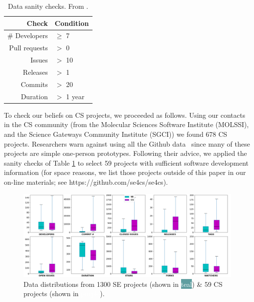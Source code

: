 \documentclass[sigconf,review,anonymous]{acmart}
\begin{document}
\begin{table}
\caption{Data sanity checks. From \cite{Kalliamvakou:2014}.}\label{tbl:sanity}
\footnotesize
 
 \begin{tabular}{r|l}
 Check   & Condition    \\\hline
 \# Developers & $\geq$ 7 \\
 Pull requests  & $>$ 0 \\
Issues & $>$ 10 \\
Releases &  $>$ 1 \\
Commits & $>$ 20 \\
Duration  & $>$ 1 year 
\end{tabular}%
 
\end{table}
To check our beliefs on CS projects, we proceeded as follows. 
Using our contacts in the CS community
(from the Molecular Sciences Software Institute (MOLSSI), and the Science Gateways Community Institute (SGCI)) we found
678 CS  projects.
Researchers
warn against using all the Github data~\cite{bird09promise,agrawal2018we, eirini15promise, munaiah17curating} since
many of these projects are simple one-person prototypes.
Following  their advice, we applied the sanity checks of Table \ref{tbl:sanity}
to select 59  projects with sufficient software development information
(for space reasons, we list those projects outside of this paper in our on-line materials; see https://github.com/se4cs/se4cs).
 
\begin{figure}[!t]
\vspace{5pt}
\centering \includegraphics[width=\linewidth]{img/comparison.png}
\caption{Data distributions from 1300 SE projects (shown in \colorbox{cadetblue}{ \textcolor{white}{teal}}) \& 59 CS projects (shown in \colorbox{amethyst}{ \textcolor{white}{purple}}).}\label{fig:comparison}
\end{figure}    
\end{document}

